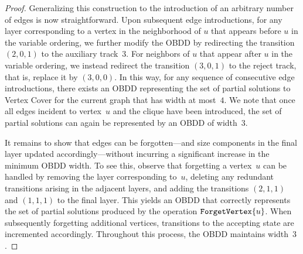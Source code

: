 \begin{proof}
Generalizing this construction to the introduction of an arbitrary number of
edges is now straightforward. Upon subsequent edge introductions, for any layer
corresponding to a vertex in the neighborhood of $u$ that appears before $u$ in
the variable ordering, we further modify the OBDD by redirecting the transition
$(2,0,1)$ to the auxiliary track~$3$. For neighbors of $u$ that appear after $u$
in the variable ordering, we instead redirect the transition $(3,0,1)$ to the
reject track, that is, replace it by $(3,0,0)$. In this way, for any sequence of
consecutive edge introductions, there exists an OBDD representing the set of
partial solutions to {\sc Vertex Cover} for the current graph that has width at
most~$4$. We note that once all edges incident to vertex~$u$ and the clique have
been introduced, the set of partial solutions can again be represented by an
OBDD of width~$3$.

It remains to show that edges can be forgotten—and size components in the final
layer updated accordingly—without incurring a significant increase in the
minimum OBDD width. To see this, observe that forgetting a vertex~$u$ can be
handled by removing the layer corresponding to~$u$, deleting any redundant
transitions arising in the adjacent layers, and adding the transitions
$(2,1,1)$ and $(1,1,1)$ to the final layer. This yields an OBDD that correctly
represents the set of partial solutions produced by the operation
$\texttt{ForgetVertex}\{u\}$. When subsequently forgetting additional vertices, transitions
to the accepting state are incremented accordingly. Throughout this process, the
OBDD maintains width~$3$.

  

\end{proof}

